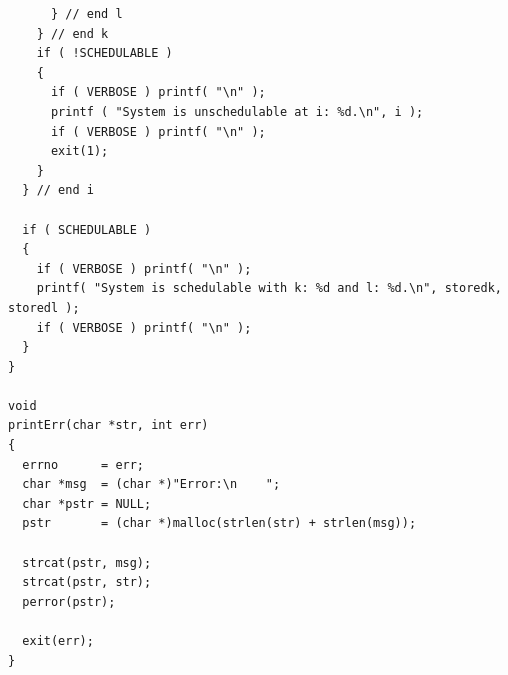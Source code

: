\documentclass[11pt]{report}
\begin{document}
\begin{spacing}{1.5}
\begin{lstlisting}
      } // end l
    } // end k
    if ( !SCHEDULABLE )
    {
      if ( VERBOSE ) printf( "\n" );
      printf ( "System is unschedulable at i: %d.\n", i );
      if ( VERBOSE ) printf( "\n" );
      exit(1);
    }
  } // end i

  if ( SCHEDULABLE )
  {
    if ( VERBOSE ) printf( "\n" );
    printf( "System is schedulable with k: %d and l: %d.\n", storedk, storedl );
    if ( VERBOSE ) printf( "\n" );
  }
}

void
printErr(char *str, int err)
{
  errno      = err;
  char *msg  = (char *)"Error:\n    ";
  char *pstr = NULL;
  pstr       = (char *)malloc(strlen(str) + strlen(msg));

  strcat(pstr, msg);
  strcat(pstr, str);
  perror(pstr);

  exit(err);
}
\end{lstlisting}


\end{spacing}
\end{document}

